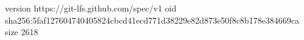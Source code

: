 version https://git-lfs.github.com/spec/v1
oid sha256:5faf127604740405824cbcd41ecd771d38229e82d873e50f8c8b178e384669ca
size 2618
